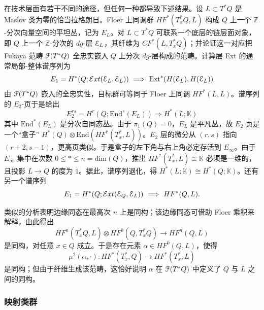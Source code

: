 \documentclass[11pt,a4paper]{article}
\numberwithin{equation}{section}
\newcommand{\bZ}{\mathbb{Z}}
\newcommand{\bK}{\mathbb{K}}
\newcommand{\Z}{\mathbb{Z}}
\newcommand{\scrE}{\EuScript{E}}
\newcommand{\scrF}{\EuScript{F}}
\newcommand{\End}{\mathrm{End}}
\newcommand{\iso}{\cong}
\begin{document}
在技术层面有若干不同的途径，但任何一种都导致下述结果。设 $L\subset T^*Q$ 是 Maslov 类为零的恰当拉格朗日。Floer 上同调群 $HF^*(T^*_xQ,L)$ 构成 $Q$ 上一个 $\Z$-分次向量空间的平坦丛，记为 $E_L$。对 $L\subset T^*Q$ 可联系一个底层的链层面对象，即 $Q$ 上一个 $\bZ$-分次的 $dg$-层 $\scrE_L$，其纤维为 $CF^*(L, T_x^*Q)$；并论证这一对应把 Fukaya 范畴 $\scrF(T^*Q)$ 全忠实嵌入 $Q$ 上分次 $dg$-层构成的范畴。计算层 Ext 的通常局部-整体谱序列为
\[
E_1 = H^*(Q; \mathcal{E}xt(\scrE_L,\scrE_L)) \ \Longrightarrow \ \mathrm{Ext}^*(H(\scrE_L), H(\scrE_L))
\]
由 $\scrF(T^*Q)$ 嵌入的全忠实性，目标群可等同于 Floer 上同调 $HF^*(L,L)$。谱序列的 $E_2$-页于是给出
\begin{equation} \label{eq:ss}
E_2^{rs} = H^r(Q;\End^s(E_L)) \Rightarrow H^*(L;\bK)
\end{equation}
其中 $\End^*(E_L)$ 是分次自同态丛。由于 $\pi_1(Q)=0$，$E_L$ 是平凡丛，故 $E_2$ 页是一个“盒子” $H^*(Q) \otimes \End(HF^*(T^*_x,L))$。$E_2$ 层的微分从 $(r,s)$ 指向 $(r+2,s-1)$，更高页类似。于是盒子的左下角与右上角必定存活到 $E_\infty$。由于 $E_{\infty}$ 集中在次数 $0\leq \ast \leq n=\mathrm{dim}(Q)$，推出 $HF^*(T^*_x,L) \iso \bK$ 必须是一维的，且投影 $L \rightarrow Q$ 的度为 $1$。据此，谱序列退化，得 $H^*(L;\bK) \iso H^*(Q;\bK)$。还有另一个谱序列
\begin{equation} \label{eq:ss2}
E_1 = H^*(Q; \mathcal{E}xt(\scrE_Q,\scrE_L)) \ \Longrightarrow \ HF^*(Q,L).
\end{equation}

类似的分析表明边缘同态在最高次 $n$ 上是同构；该边缘同态可借助 Floer 乘积来解释，由此得出
\[
HF^n(T_x^*Q, L) \otimes HF^0(Q, T_x^*Q) \longrightarrow HF^n(Q,L) 
\] 
是同构，对任意 $x\in Q$ 成立。于是存在元素 $\alpha \in HF^0(Q,L)$，使得
\[
\mu^2(\alpha,\cdot): HF^*(T_x^*,Q) \rightarrow HF^*(T_x^*,L)
\]
是同构；但由于纤维生成该范畴，这恰好说明 $\alpha$ 在 $\scrF(T^*Q)$ 中定义了 $Q$ 与 $L$ 之间的同构。

\subsubsection{映射类群\label{Sec:MCGIII}}
\end{document}
